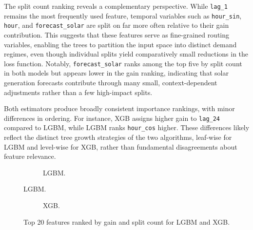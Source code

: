 The split count ranking reveals a complementary perspective. While \texttt{lag\_1} remains the most frequently used feature, temporal variables such as \texttt{hour\_sin}, \texttt{hour}, and \texttt{forecast\_solar} are split on far more often relative to their gain contribution. This suggests that these features serve as fine-grained routing variables, enabling the trees to partition the input space into distinct demand regimes, even though individual splits yield comparatively small reductions in the loss function. Notably, \texttt{forecast\_solar} ranks among the top five by split count in both models but appears lower in the gain ranking, indicating that solar generation forecasts contribute through many small, context-dependent adjustments rather than a few high-impact splits.

Both estimators produce broadly consistent importance rankings, with minor differences in ordering. For instance, \acs{XGB} assigns higher gain to \texttt{lag\_24} compared to \acs{LGBM}, while \acs{LGBM} ranks \texttt{hour\_cos} higher. These differences likely reflect the distinct tree growth strategies of the two algorithms, leaf-wise for \acs{LGBM} and level-wise for \acs{XGB}, rather than fundamental disagreements about feature relevance.
\begin{figure}[b!]
    \centering
    \begin{subfigure}[c]{\linewidth}
        \centering
        \begin{minipage}[c]{0.48\linewidth}
            \centering
        \end{minipage}%
        \begin{minipage}[c]{0.48\linewidth}
            \centering
        \end{minipage}
        \caption{\acs{LGBM}.}
        \label{fig:feature_importance_lgbm}
    \end{subfigure}
\end{figure}
\begin{figure}[t!]\ContinuedFloat
    \centering
    \begin{subfigure}[c]{\linewidth}
        \centering
        \begin{minipage}[c]{0.48\linewidth}
            \centering
        \end{minipage}%
        \begin{minipage}[c]{0.48\linewidth}
            \centering
        \end{minipage}
        \caption{\acs{XGB}.}
        \label{fig:feature_importance_xgb}
    \end{subfigure}
    \caption{Top 20 features ranked by gain and split count for \acs{LGBM} and \acs{XGB}.}
    \label{fig:feature_importance}
\end{figure}


